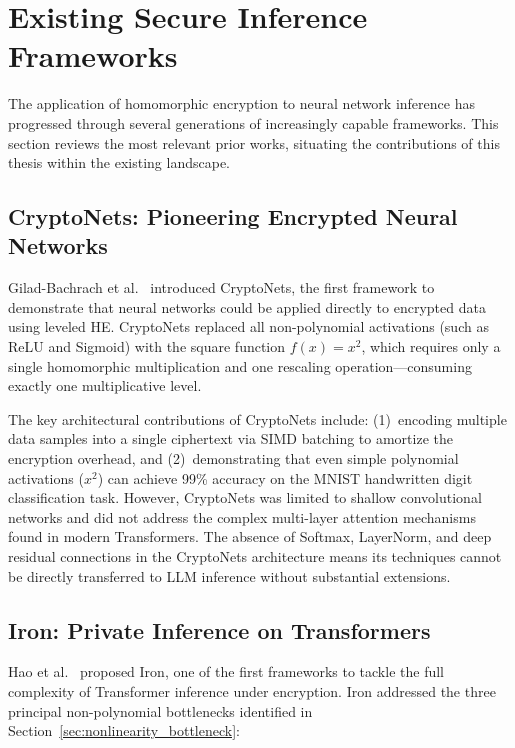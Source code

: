 \section{Existing Secure Inference Frameworks}
\label{sec:existing_frameworks}

The application of homomorphic encryption to neural network inference has progressed through several generations of increasingly capable frameworks. This section reviews the most relevant prior works, situating the contributions of this thesis within the existing landscape.

\subsection{CryptoNets: Pioneering Encrypted Neural Networks}

Gilad-Bachrach et al.~\cite{gilad2016cryptonets} introduced CryptoNets, the first framework to demonstrate that neural networks could be applied directly to encrypted data using leveled HE. CryptoNets replaced all non-polynomial activations (such as ReLU and Sigmoid) with the square function $f(x) = x^2$, which requires only a single homomorphic multiplication and one rescaling operation---consuming exactly one multiplicative level.

The key architectural contributions of CryptoNets include: (1)~encoding multiple data samples into a single ciphertext via SIMD batching to amortize the encryption overhead, and (2)~demonstrating that even simple polynomial activations ($x^2$) can achieve 99\% accuracy on the MNIST handwritten digit classification task. However, CryptoNets was limited to shallow convolutional networks and did not address the complex multi-layer attention mechanisms found in modern Transformers. The absence of Softmax, LayerNorm, and deep residual connections in the CryptoNets architecture means its techniques cannot be directly transferred to LLM inference without substantial extensions.

\subsection{Iron: Private Inference on Transformers}

Hao et al.~\cite{hao2022iron} proposed Iron, one of the first frameworks to tackle the full complexity of Transformer inference under encryption. Iron addressed the three principal non-polynomial bottlenecks identified in Section~\ref{sec:nonlinearity_bottleneck}:


